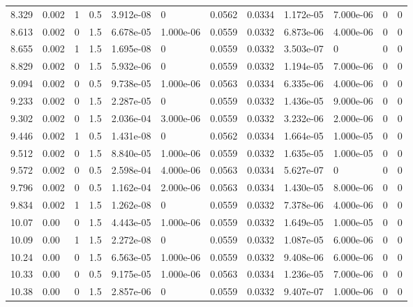 \documentclass[preview]{standalone}
\begin{document}
{{{\begin{tabular}{L{1.2cm}C{1.2cm} C{0.3cm}C{0.5cm} C{1.4cm}C{1.4cm} C{1.4cm}C{1.4cm} C{1.6cm}C{1.6cm} C{1.6cm}C{1.6cm}}
  8.329  &  0.002  & 1     & 0.5 &  3.912e-08  & 0  &  0.0562&   0.0334& 1.172e-05 & 7.000e-06   &  0 & 0  \\ 
  8.613  &  0.002  & 0     & 1.5 &  6.678e-05  & 1.000e-06  &  0.0559&   0.0332& 6.873e-06 & 4.000e-06   &  0 & 0  \\ 
  8.655  &  0.002  & 1     & 1.5 &  1.695e-08  & 0  &  0.0559&   0.0332& 3.503e-07 & 0   &  0 & 0  \\ 
  8.829  &  0.002  & 0     & 1.5 &  5.932e-06  & 0  &  0.0559&   0.0332& 1.194e-05 & 7.000e-06   &  0 & 0  \\ 
  9.094  &  0.002  & 0     & 0.5 &  9.738e-05  & 1.000e-06  &  0.0563&   0.0334& 6.335e-06 & 4.000e-06   &  0 & 0  \\ 
  9.233  &  0.002  & 0     & 1.5 &  2.287e-05  & 0  &  0.0559&   0.0332& 1.436e-05 & 9.000e-06   &  0 & 0  \\ 
  9.302  &  0.002  & 0     & 1.5 &  2.036e-04  & 3.000e-06  &  0.0559&   0.0332& 3.232e-06 & 2.000e-06   &  0 & 0  \\ 
  9.446  &  0.002  & 1     & 0.5 &  1.431e-08  & 0  &  0.0562&   0.0334& 1.664e-05 & 1.000e-05   &  0 & 0  \\ 
  9.512  &  0.002  & 0     & 1.5 &  8.840e-05  & 1.000e-06  &  0.0559&   0.0332& 1.635e-05 & 1.000e-05   &  0 & 0  \\ 
  9.572  &  0.002  & 0     & 0.5 &  2.598e-04  & 4.000e-06  &  0.0563&   0.0334& 5.627e-07 & 0   &  0 & 0  \\ 
  9.796  &  0.002  & 0     & 0.5 &  1.162e-04  & 2.000e-06  &  0.0563&   0.0334& 1.430e-05 & 8.000e-06   &  0 & 0  \\ 
  9.834  &  0.002  & 1     & 1.5 &  1.262e-08  & 0  &  0.0559&   0.0332& 7.378e-06 & 4.000e-06   &  0 & 0  \\ 
  10.07  &  0.00  & 0     & 1.5 &  4.443e-05  & 1.000e-06  &  0.0559&   0.0332& 1.649e-05 & 1.000e-05   &  0 & 0  \\ 
  10.09  &  0.00  & 1     & 1.5 &  2.272e-08  & 0  &  0.0559&   0.0332& 1.087e-05 & 6.000e-06   &  0 & 0  \\ 
  10.24  &  0.00  & 0     & 1.5 &  6.563e-05  & 1.000e-06  &  0.0559&   0.0332& 9.408e-06 & 6.000e-06   &  0 & 0  \\ 
  10.33  &  0.00  & 0     & 0.5 &  9.175e-05  & 1.000e-06  &  0.0563&   0.0334& 1.236e-05 & 7.000e-06   &  0 & 0  \\ 
  10.38  &  0.00  & 0     & 1.5 &  2.857e-06  & 0  &  0.0559&   0.0332& 9.407e-07 & 1.000e-06   &  0 & 0  \\ 

\end{tabular}}}}
\end{document}
